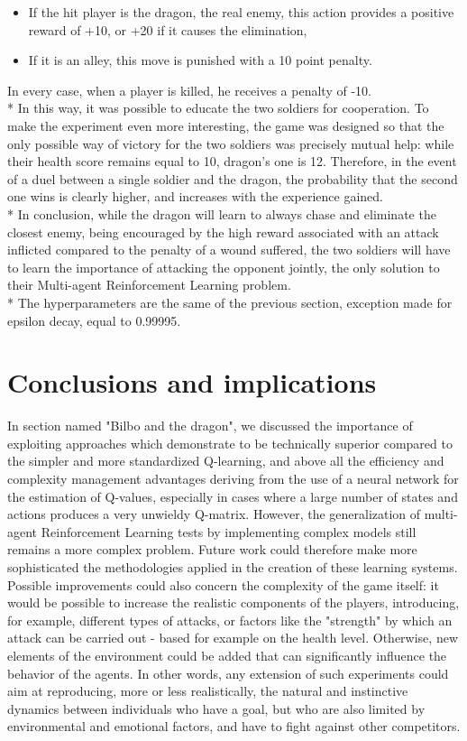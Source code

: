 \begin{itemize}
  \item If the hit player is the dragon, the real enemy, this action provides a positive reward of +10, or +20 if it causes the elimination,
  \item If it is an alley, this move is punished with a 10 point penalty.
\end{itemize}
In every case, when a player is killed, he receives a penalty of -10.\\*
In this way, it was possible to educate the two soldiers for cooperation. To make the experiment even more interesting, the game was designed so that the only possible way of victory for the two soldiers was precisely mutual help: while their health score remains equal to 10, dragon's one is 12. Therefore, in the event of a duel between a single soldier and the dragon, the probability that the second one wins is clearly higher, and increases with the experience gained.\\*
In conclusion, while the dragon will learn to always chase and eliminate the closest enemy, being encouraged by the high reward associated with an attack inflicted compared to the penalty of a wound suffered, the two soldiers will have to learn the importance of attacking the opponent jointly, the only solution to their Multi-agent Reinforcement Learning problem.\\*
The hyperparameters are the same of the previous section, exception made for epsilon decay, equal to 0.99995.

\section{Conclusions and implications}
In section named "Bilbo and the dragon", we discussed the importance of exploiting approaches which demonstrate to be technically superior compared to the simpler and more standardized Q-learning, and above all the efficiency and complexity management advantages deriving from the use of a neural network for the estimation of Q-values, especially in cases where a large number of states and actions produces a very unwieldy Q-matrix. However, the generalization of multi-agent Reinforcement Learning tests by implementing complex models still remains a more complex problem. Future work could therefore make more sophisticated the methodologies applied in the creation of these learning systems.
Possible improvements could also concern the complexity of the game itself: it would be possible to increase the realistic components of the players, introducing, for example, different types of attacks, or factors like the "strength" by which an attack can be carried out - based for example on the health level. Otherwise, new elements of the environment could be added that can significantly influence the behavior of the agents.
In other words, any extension of such experiments could aim at reproducing, more or less realistically, the natural and instinctive dynamics between individuals who have a goal, but who are also limited by environmental and emotional factors, and have to fight against other competitors.





